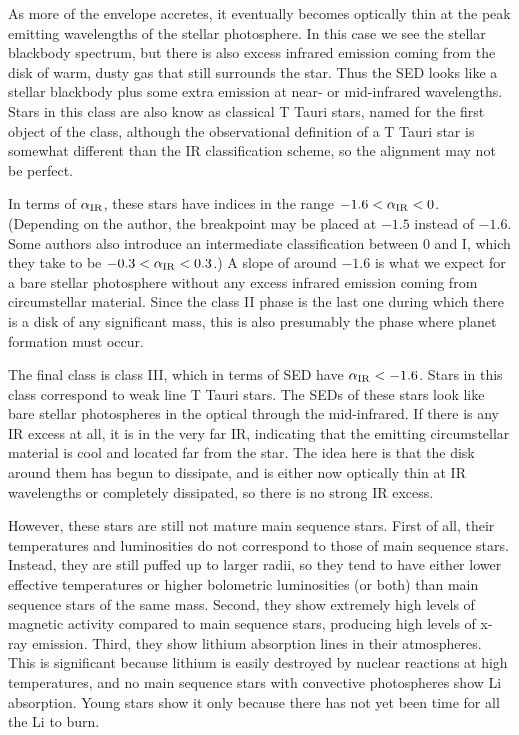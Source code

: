 As more of the envelope accretes, it eventually becomes optically thin at the peak emitting wavelengths of the stellar photosphere. In this case we see the stellar blackbody spectrum, but there is also excess infrared emission coming from the disk of warm, dusty gas that still surrounds the star. Thus the SED looks like a stellar blackbody plus some extra emission at near- or mid-infrared wavelengths. Stars in this class are also know as classical T Tauri stars, named for the first object of the class, although the observational definition of a T Tauri star is somewhat different than the IR classification scheme, so the alignment may not be perfect.

In terms of $\alpha_{\rm IR}$, these stars have indices in the range $-1.6 < \alpha_{\rm IR} < 0$. (Depending on the author, the breakpoint may  be placed at $-1.5$ instead of $-1.6$. Some authors also introduce an intermediate classification between 0 and I, which they take to be $-0.3 < \alpha_{\rm IR} < 0.3$.) A slope of around $-1.6$ is what we expect for a bare stellar photosphere without any excess infrared emission coming from circumstellar material. Since the class II phase is the last one during which there is a disk of any significant mass, this is also presumably the phase where planet formation must occur.

The final class is class III, which in terms of SED have $\alpha_{\rm IR} < -1.6$. Stars in this class correspond to weak line T Tauri stars. The SEDs of these stars look like bare stellar photospheres in the optical through the mid-infrared. If there is any IR excess at all, it is in the very far IR, indicating that the emitting circumstellar material is cool and located far from the star. The idea here is that the disk around them has begun to dissipate, and is either now optically thin at IR wavelengths or completely dissipated, so there is no strong IR excess. 

However, these stars are still not mature main sequence stars. First of all, their temperatures and luminosities do not correspond to those of main sequence stars. Instead, they are still puffed up to larger radii, so they tend to have either lower effective temperatures or higher bolometric luminosities (or both) than main sequence stars of the same mass. Second, they show extremely high levels of magnetic activity compared to main sequence stars, producing high levels of x-ray emission. Third, they show lithium absorption lines in their atmospheres. This is significant because lithium is easily destroyed by nuclear reactions at high temperatures, and no main sequence stars with convective photospheres show Li absorption. Young stars show it only because there has not yet been time for all the Li to burn.

